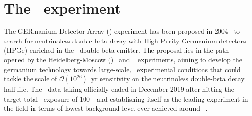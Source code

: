
\chapter{The \gerda\ experiment}\label{chap:gerda}

The GERmanium Detector Array (\gerda) experiment has been proposed in
2004~\cite{gerda-proposal} to search for neutrinoless double-beta decay with High-Purity
Germanium detectors (HPGe) enriched in the \gesix\ double-beta emitter. The proposal lies in the
path opened by the Heidelberg-Moscow (\hdm)~\cite{Klapdor2001} and
\igex~\cite{Aalseth2002} experiments, aiming to develop the germanium technology towards
large-scale, \bkgfree\ experimental conditions that could tackle the scale of
$\mathcal{O}(10^{26})$~yr sensitivity on the neutrinoless double-beta decay half-life. The
\gerda\ data taking officially ended in December 2019 after hitting the target total
\bkgfree\ exposure of 100~\kgyr\ and establishing itself as the leading experiment in the
field in terms of lowest background level ever achieved around \qbb~\cite{Agostini2019a}.

